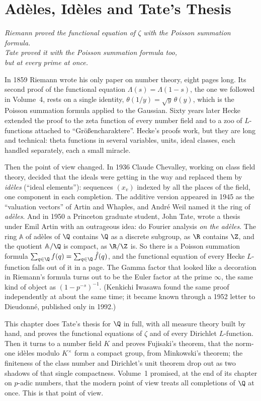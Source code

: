\chapter{Ad\`eles, Id\`eles and Tate's Thesis}
\begin{center}\itshape
Riemann proved the functional equation of $\zeta$ with the Poisson summation formula.\\
Tate proved it with the Poisson summation formula too,\\
but at every prime at once.
\end{center}

In 1859 Riemann wrote his only paper on number theory, eight pages long. Its second proof of the functional equation
$\Lambda(s)=\Lambda(1-s)$, the one we followed in Volume~4, rests on a single identity, $\theta(1/y)=\sqrt y\,\theta(y)$, which is
the Poisson summation formula applied to the Gaussian. Sixty years later Hecke extended the proof to the zeta function of every
number field and to a zoo of $L$-functions attached to ``Gr\"o\ss encharaktere''. Hecke's proofs work, but they are long and
technical: theta functions in several variables, units, ideal classes, each handled separately, each a small miracle.

Then the point of view changed. In 1936 Claude Chevalley, working on class field theory, decided that the ideals were getting in the
way and replaced them by \emph{id\`eles} (``ideal elements''): sequences $(x_v)$ indexed by all the places of the field, one
component in each completion. The additive version appeared in 1945 as the ``valuation vectors'' of Artin and Whaples, and Andr\'e Weil named it the ring of \emph{ad\`eles}. And in 1950 a Princeton graduate student,
John Tate, wrote a thesis under Emil Artin with an outrageous idea: do Fourier analysis \emph{on the ad\`eles}. The ring $\mathbb{A}$ of
ad\`eles of $\Q$ contains $\Q$ as a discrete subgroup, as $\R$ contains $\Z$, and the quotient $\mathbb{A}/\Q$ is compact, as $\R/\Z$ is.
So there is a Poisson summation formula $\sum_{q\in\Q}f(q)=\sum_{q\in\Q}\hat f(q)$, and the functional equation of every Hecke
$L$-function falls out of it in a page. The Gamma factor that looked like a decoration in Riemann's formula turns out to be the
Euler factor at the prime $\infty$, the same kind of object as $(1-p^{-s})^{-1}$. (Kenkichi Iwasawa found the same proof
independently at about the same time; it became known through a 1952 letter to Dieudonn\'e, published only in 1992.)

This chapter does Tate's thesis for $\Q$ in full, with all measure theory built by hand, and proves the functional equations of
$\zeta$ and of every Dirichlet $L$-function. Then it turns to a number field $K$ and proves Fujisaki's theorem, that the norm-one
id\`eles modulo $K^\times$ form a compact group, from Minkowski's theorem; the finiteness of the class number and Dirichlet's unit
theorem drop out as two shadows of that single compactness. Volume~1 promised, at the end of its chapter on $p$-adic numbers, that
the modern point of view treats all completions of $\Q$ at once. This is that point of view.

